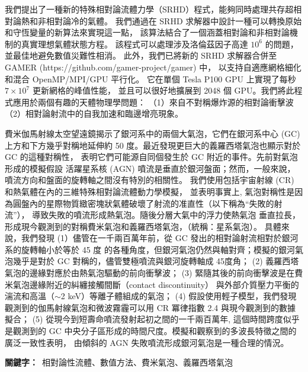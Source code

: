 \begin{abstractzh}
{我們提出了一種新的特殊相對論流體力學（SRHD）程式，能夠同時處理共存超相對論熱和非相對論冷的氣體。
我們通過在 SRHD 求解器中設計一種可以轉換原始和守恆變量的新算法來實現這一點，
該算法結合了一個涵蓋相對論和非相對論機制的真實理想氣體狀態方程。
該程式可以處理涉及洛倫茲因子高達 $10^6$ 的問題，並最佳地避免數值災難性相消。
此外，我們已將新的 SRHD 求解器合併至 GAMER (https://github.com/gamer-project/gamer) 中，
以支持自適應網格細化和混合 OpenMP/MPI/GPU 平行化。
它在單個 Tesla P100 GPU 上實現了每秒 $7\times10^7$ 更新網格的峰值性能，
並且可以很好地擴展到 2048 個 GPU。我們將此程式應用於兩個有趣的天體物理學問題：
（1）來自不對稱爆炸源的相對論衝擊波（2）相對論射流中的自我加速和臨邊增亮現象。

費米伽馬射線太空望遠鏡揭示了銀河系中的兩個大氣泡，它們在銀河系中心 (GC)
上方和下方幾乎對稱地延伸約 50 度。最近發現更巨大的義羅西塔氣泡也顯示對於 GC 的這種對稱性，
表明它們可能源自同個發生於 GC 附近的事件。先前對氣泡形成的模擬假設
活躍星系核 (AGN) 噴流是垂直於銀河盤面；然而，一般來說，噴流方向和盤面的旋轉軸之間沒有特別的相關性。
我們使用包括宇宙射線 (CR) 和熱氣體在內的三維特殊相對論流體動力學模擬，
並表明事實上, 氣泡對稱性是因為圓盤內的星際物質緻密塊狀氣體破壞了射流的准直性（以下稱為“失敗的射流”），
導致失敗的噴流形成熱氣泡。隨後分層大氣中的浮力使熱氣泡
垂直拉長，形成現今觀測到的對稱費米氣泡和義羅西塔氣泡，（統稱：星系氣泡）。
具體來說，我們發現
(1）儘管在一千兩百萬年前，從 GC 發出的相對論射流相對於銀河系的旋轉軸小於等於 45 度
的各種角度，但銀河氣泡仍然與軸對齊；模擬的銀河氣泡幾乎是對於 GC 對稱的，儘管雙極噴流與銀河旋轉軸成 45度角；
(2) 義羅西塔氣泡的邊緣對應於由熱氣泡驅動的前向衝擊波；
(3) 緊隨其後的前向衝擊波是在費米氣泡邊緣附近的糾纏接觸間斷（contact discontinuity）
與外部介質壓力平衡的湍流和高溫（$\sim$2 keV）等離子體組成的氣泡；
(4) 假設使用輕子模型，我們發現觀測到的伽馬射線氣泡和微波霧霾可以用 CR 冪律指數 2.4 與現今觀測到的數據擬合；
(5) 從現今到短壽命噴流發射起初之間的一千兩百萬年, 這個時間跨度似乎是觀測到的 GC
中央分子區形成的時間尺度。模擬和觀察到的多波長特徵之間的廣泛一致性表明，
由傾斜的 AGN 失敗噴流形成銀河氣泡是一種合理的情況。}
\bigbreak
\noindent \textbf{關鍵字：}{\, \makeatletter 相對論性流體、數值方法、費米氣泡、義羅西塔氣泡 \makeatother}
\end{abstractzh}

